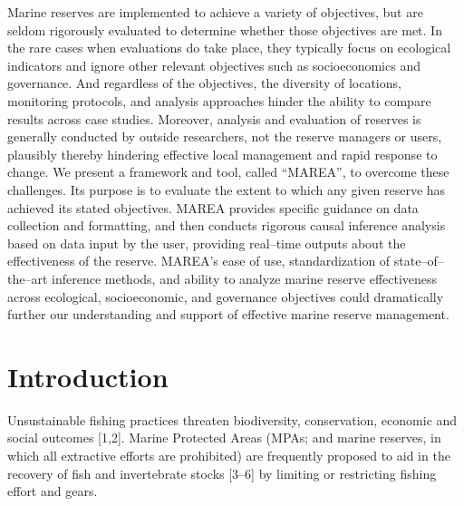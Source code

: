 \documentclass[12pt,]{article}
\begin{document}
Marine reserves are implemented to achieve a variety of objectives, but
are seldom rigorously evaluated to determine whether those objectives
are met. In the rare cases when evaluations do take place, they
typically focus on ecological indicators and ignore other relevant
objectives such as socioeconomics and governance. And regardless of the
objectives, the diversity of locations, monitoring protocols, and
analysis approaches hinder the ability to compare results across case
studies. Moreover, analysis and evaluation of reserves is generally
conducted by outside researchers, not the reserve managers or users,
plausibly thereby hindering effective local management and rapid
response to change. We present a framework and tool, called ``MAREA'',
to overcome these challenges. Its purpose is to evaluate the extent to
which any given reserve has achieved its stated objectives. MAREA
provides specific guidance on data collection and formatting, and then
conducts rigorous causal inference analysis based on data input by the
user, providing real--time outputs about the effectiveness of the
reserve. MAREA's ease of use, standardization of state--of--the--art
inference methods, and ability to analyze marine reserve effectiveness
across ecological, socioeconomic, and governance objectives could
dramatically further our understanding and support of effective marine
reserve management.

\section{Introduction}\label{introduction}

Unsustainable fishing practices threaten biodiversity, conservation,
economic and social outcomes {[}1,2{]}. Marine Protected Areas (MPAs;
and marine reserves, in which all extractive efforts are prohibited) are
frequently proposed to aid in the recovery of fish and invertebrate
stocks {[}3--6{]} by limiting or restricting fishing effort and gears.
\end{document}

